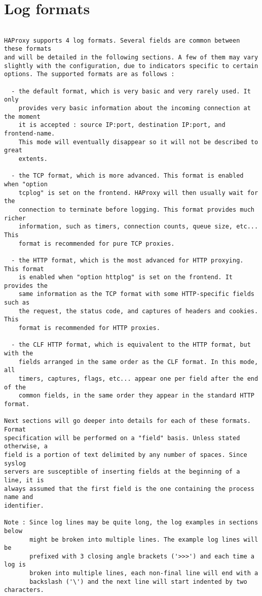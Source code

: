 
\section{Log formats}

\begin{verbatim}

HAProxy supports 4 log formats. Several fields are common between these formats
and will be detailed in the following sections. A few of them may vary
slightly with the configuration, due to indicators specific to certain
options. The supported formats are as follows :

  - the default format, which is very basic and very rarely used. It only
    provides very basic information about the incoming connection at the moment
    it is accepted : source IP:port, destination IP:port, and frontend-name.
    This mode will eventually disappear so it will not be described to great
    extents.

  - the TCP format, which is more advanced. This format is enabled when "option
    tcplog" is set on the frontend. HAProxy will then usually wait for the
    connection to terminate before logging. This format provides much richer
    information, such as timers, connection counts, queue size, etc... This
    format is recommended for pure TCP proxies.

  - the HTTP format, which is the most advanced for HTTP proxying. This format
    is enabled when "option httplog" is set on the frontend. It provides the
    same information as the TCP format with some HTTP-specific fields such as
    the request, the status code, and captures of headers and cookies. This
    format is recommended for HTTP proxies.

  - the CLF HTTP format, which is equivalent to the HTTP format, but with the
    fields arranged in the same order as the CLF format. In this mode, all
    timers, captures, flags, etc... appear one per field after the end of the
    common fields, in the same order they appear in the standard HTTP format.

Next sections will go deeper into details for each of these formats. Format
specification will be performed on a "field" basis. Unless stated otherwise, a
field is a portion of text delimited by any number of spaces. Since syslog
servers are susceptible of inserting fields at the beginning of a line, it is
always assumed that the first field is the one containing the process name and
identifier.

Note : Since log lines may be quite long, the log examples in sections below
       might be broken into multiple lines. The example log lines will be
       prefixed with 3 closing angle brackets ('>>>') and each time a log is
       broken into multiple lines, each non-final line will end with a
       backslash ('\') and the next line will start indented by two characters.


\end{verbatim}

